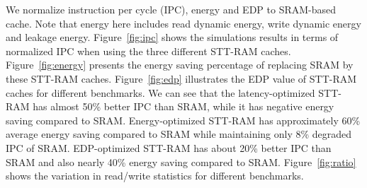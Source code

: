We normalize instruction per cycle (IPC), energy and EDP to SRAM-based cache. Note that energy here includes read dynamic energy, write dynamic energy and leakage energy. Figure~\ref{fig:ipc} shows the simulations results in terms of normalized IPC when using the three different STT-RAM caches. Figure~\ref{fig:energy} presents the energy saving percentage of replacing SRAM by these STT-RAM caches. Figure~\ref{fig:edp} illustrates the EDP value of STT-RAM caches for different benchmarks. We can see that the latency-optimized STT-RAM has almost 50\% better IPC than SRAM, while it has negative energy saving compared to SRAM. Energy-optimized STT-RAM has approximately 60\% average energy saving compared to SRAM while maintaining only 8\% degraded IPC of SRAM. EDP-optimized STT-RAM has about 20\% better IPC than SRAM and also nearly 40\% energy saving compared to SRAM. Figure~\ref{fig:ratio} shows the variation in read/write statistics for different benchmarks. 